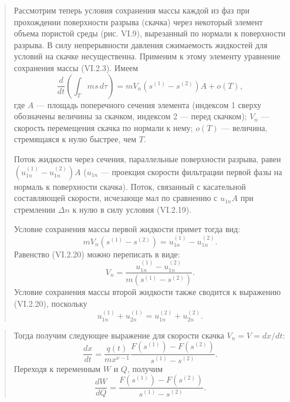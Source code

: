 \documentclass[12pt,a4paper]{article}
\begin{document}
\begin{quote}\sloppy
Рассмотрим теперь условия сохранения массы каждой из фаз при прохождении поверхности разрыва (скачка) через некоторый элемент объема пористой среды (рис. VI.9), вырезанный по нормали к поверхности разрыва. В силу непрерывности давления сжимаемость
жидкостей для условий на скачке несущественна. Применим к этому элементу уравнение сохранения массы (VI.2.3). Имеем
\[\frac{d}{dt}\left(\int_Tms\,d\tau\right)=mV_n(s^{(1)}-s^{(2)})A+o(T),\]
где $A$ --- площадь поперечного сечения элемента (индексом 1 сверху обозначены величины за скачком, индексом 2 --- перед скачком); $V_n$ --- скорость перемещения скачка по нормали к нему; $o(T)$ --- величина, стремящаяся к нулю быстрее, чем $T$.


Поток жидкости через сечения, параллельные поверхности разрыва, равен $(u_{1n}^{(1)}-u_{1n}^{(2)})A$ ($u_{1n}$ --- проекция скорости фильтрации первой фазы на нормаль к поверхности скачка). Поток, связанный с касательной составляющей скорости, исчезающе мал по сравнению с $u_{1n}A$ при стремлении $\Delta n$ к нулю в силу условия (VI.2.19).

Условие сохранения массы первой жидкости примет тогда вид:
\begin{equation}mV_n(s^{(1)}-s^{(2)})=u_{1n}^{(1)}-u_{1n}^{(2)}.\tag{VI.2.20}\label{q11:eq-VI-2-20}\end{equation}
Равенство (VI.2.20) можно переписать в виде:
\begin{equation}V_n=\frac{u_{1n}^{(1)}-u_{1n}^{(2)}}{m(s^{(1)}-s^{(2)})}.\tag{VI.2.21}\label{q11:eq-VI-2-21}\end{equation}
Условие сохранения массы второй жидкости также сводится к выражению (VI.2.20), поскольку
\begin{equation}u_{1n}^{(1)}+u_{2n}^{(1)}=u_{1n}^{(2)}+u_{2n}^{(2)}.\tag{VI.2.22}\label{q11:eq-VI-2-22}\end{equation}
\par\nobreak{}\par
\end{quote}

\begin{quote}\sloppy
Тогда получим следующее выражение для скорости скачка $V_n=V=dx/dt$:
\begin{equation}\frac{dx}{dt}=\frac{q(t)}{mx^{\nu-1}}\frac{F(s^{(1)})-F(s^{(2)})}{s^{(1)}-s^{(2)}}.\tag{VI.2.24}\label{q11:eq-VI-2-24}\end{equation}
Переходя к переменным $W$ и $Q$, получим
\begin{equation}\frac{dW}{dQ}=\frac{F(s^{(1)})-F(s^{(2)})}{s^{(1)}-s^{(2)}}.\tag{VI.2.25}\label{q11:eq-VI-2-25}\end{equation}
\par\nobreak{}\par
\end{quote}
\endgroup
\end{document}
